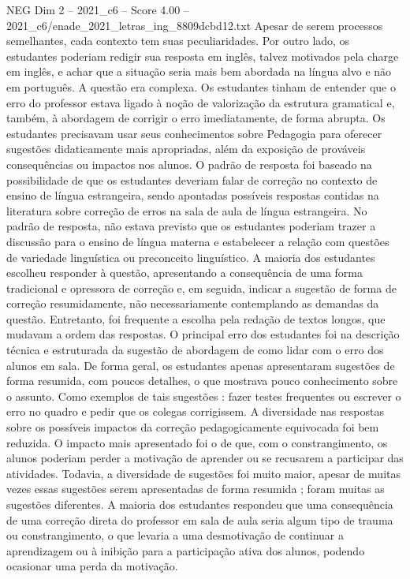 \begin{textsample}{NEG Dim 2 – 2021\_c6 – Score 4.00 – 2021\_c6/enade\_2021\_letras\_ing\_8809dcbd12.txt}
Apesar de serem processos semelhantes, cada contexto tem suas peculiaridades.
Por outro lado, os estudantes poderiam redigir sua resposta em inglês, talvez motivados pela charge em inglês, e achar que a situação seria mais bem abordada na língua alvo e não em português.
A questão era complexa.
Os estudantes tinham de entender que o erro do professor estava ligado à noção de valorização da estrutura gramatical e, também, à abordagem de corrigir o erro imediatamente, de forma abrupta.
Os estudantes precisavam usar seus conhecimentos sobre Pedagogia para oferecer sugestões didaticamente mais apropriadas, além da exposição de prováveis consequências ou impactos nos alunos.
O padrão de resposta foi baseado na possibilidade de que os estudantes deveriam falar de correção no contexto de ensino de língua estrangeira, sendo apontadas possíveis respostas contidas na literatura sobre correção de erros na sala de aula de língua estrangeira.
No padrão de resposta, não estava previsto que os estudantes poderiam trazer a discussão para o ensino de língua materna e estabelecer a relação com questões de variedade linguística ou preconceito linguístico.
A maioria dos estudantes escolheu responder à questão, apresentando a consequência de uma forma tradicional e opressora de correção e, em seguida, indicar a sugestão de forma de correção resumidamente, não necessariamente contemplando as demandas da questão.
Entretanto, foi frequente a escolha pela redação de textos longos, que mudavam a ordem das respostas.
O principal erro dos estudantes foi na descrição técnica e estruturada da sugestão de abordagem de como lidar com o erro dos alunos em sala.
De forma geral, os estudantes apenas apresentaram sugestões de forma resumida, com poucos detalhes, o que mostrava pouco conhecimento sobre o assunto.
Como exemplos de tais sugestões : fazer testes frequentes ou escrever o erro no quadro e pedir que os colegas corrigissem.
A diversidade nas respostas sobre os possíveis impactos da correção pedagogicamente equivocada foi bem reduzida.
O impacto mais apresentado foi o de que, com o constrangimento, os alunos poderiam perder a motivação de aprender ou se recusarem a participar das atividades.
Todavia, a diversidade de sugestões foi muito maior, apesar de muitas vezes essas sugestões serem apresentadas de forma resumida ; foram muitas as sugestões diferentes.
A maioria dos estudantes respondeu que uma consequência de uma correção direta do professor em sala de aula seria algum tipo de trauma ou constrangimento, o que levaria a uma desmotivação de continuar a aprendizagem ou à inibição para a participação ativa dos alunos, podendo ocasionar uma perda da motivação.

\end{textsample}
